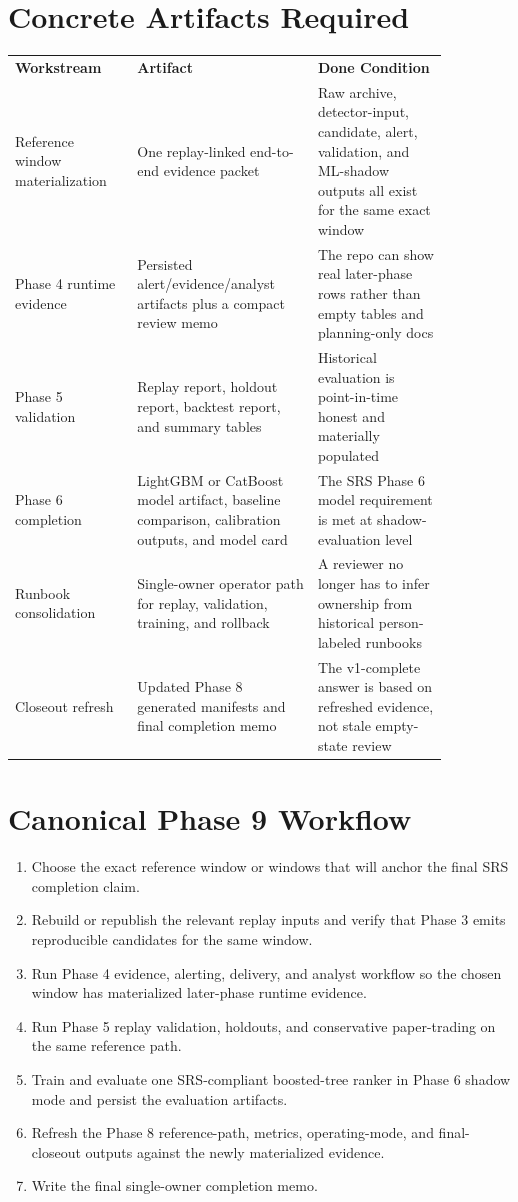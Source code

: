 \documentclass{article}
\begin{document}
\section*{Concrete Artifacts Required}
\begin{longtable}{p{0.24\linewidth}p{0.36\linewidth}p{0.26\linewidth}}
\textbf{Workstream} & \textbf{Artifact} & \textbf{Done Condition} \\
Reference window materialization & One replay-linked end-to-end evidence packet & Raw archive, detector-input, candidate, alert, validation, and ML-shadow outputs all exist for the same exact window \\
Phase 4 runtime evidence & Persisted alert/evidence/analyst artifacts plus a compact review memo & The repo can show real later-phase rows rather than empty tables and planning-only docs \\
Phase 5 validation & Replay report, holdout report, backtest report, and summary tables & Historical evaluation is point-in-time honest and materially populated \\
Phase 6 completion & LightGBM or CatBoost model artifact, baseline comparison, calibration outputs, and model card & The SRS Phase 6 model requirement is met at shadow-evaluation level \\
Runbook consolidation & Single-owner operator path for replay, validation, training, and rollback & A reviewer no longer has to infer ownership from historical person-labeled runbooks \\
Closeout refresh & Updated Phase 8 generated manifests and final completion memo & The v1-complete answer is based on refreshed evidence, not stale empty-state review \\
\end{longtable}

\section*{Canonical Phase 9 Workflow}
\begin{enumerate}
\item Choose the exact reference window or windows that will anchor the final SRS completion claim.
\item Rebuild or republish the relevant replay inputs and verify that Phase 3 emits reproducible candidates for the same window.
\item Run Phase 4 evidence, alerting, delivery, and analyst workflow so the chosen window has materialized later-phase runtime evidence.
\item Run Phase 5 replay validation, holdouts, and conservative paper-trading on the same reference path.
\item Train and evaluate one SRS-compliant boosted-tree ranker in Phase 6 shadow mode and persist the evaluation artifacts.
\item Refresh the Phase 8 reference-path, metrics, operating-mode, and final-closeout outputs against the newly materialized evidence.
\item Write the final single-owner completion memo.
\end{enumerate}
\end{document}
